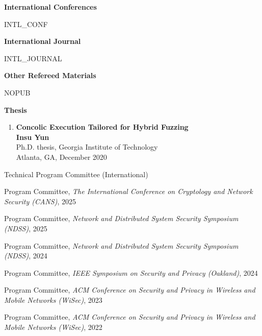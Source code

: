 \documentclass[11pt,letterpaper]{article}
\begin{document}
%
%


\textbf{International Conferences }
\begin{enumerate}
  {{ INTL_CONF }}
\end{enumerate}

\textbf{International Journal}
\begin{enumerate}[resume]
  {{ INTL_JOURNAL }}
\end{enumerate}

\begin{comment}
\textbf{Domestic Conferences}
\begin{enumerate}[resume]
  {{ DOM_CONF }}
\end{enumerate}
\end{comment}

\textbf{Other Refereed Materials}
\begin{enumerate}[resume]
  {{ NOPUB }}
\end{enumerate}

\textbf{Thesis}
\begin{enumerate}[resume]
\item \textbf{Concolic Execution Tailored for Hybrid Fuzzing}  \\
{\footnotesize
  \textbf{Insu Yun} \\
  Ph.D. thesis, Georgia Institute of Technology \\
Atlanta, GA, December 2020
}
\end{enumerate}

\begin{topic}{Technical Program Committee (International)}{}
  \item{Program Committee, \emph{The International Conference on Cryptology and Network Security (CANS)}, 2025} %
  \item{Program Committee, \emph{Network and Distributed System Security Symposium (NDSS)}, 2025} %
  \item{Program Committee, \emph{Network and Distributed System Security Symposium (NDSS)}, 2024} %
  \item{Program Committee, \emph{IEEE Symposium on Security and Privacy (Oakland)}, 2024} %
  \item{Program Committee, \emph{ACM Conference on Security and Privacy in Wireless and Mobile Networks (WiSec)}, 2023} %
  \item{Program Committee, \emph{ACM Conference on Security and Privacy in Wireless and Mobile Networks (WiSec)}, 2022} %
\end{topic}
\end{document}
